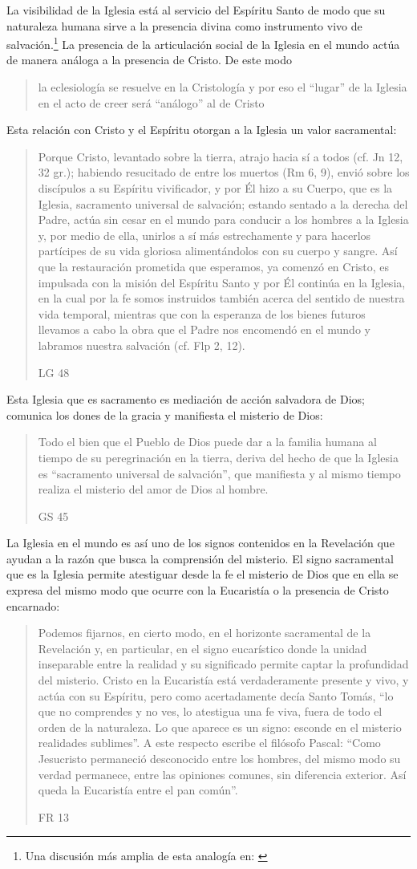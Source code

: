 La visibilidad de la Iglesia está al servicio del Espíritu Santo de modo que su
naturaleza humana sirve a la presencia divina como instrumento vivo de
salvación.\footnote{Una discusión más amplia de esta analogía en:
  \cite[292ss]{ninot2009tf}} La presencia de la articulación social de la
Iglesia en el mundo actúa de manera análoga a la presencia de Cristo. De este
modo \blockquote[{\cite[566]{ninot2009tf}}]{la eclesiología se resuelve en la
  Cristología y por eso el \enquote{lugar} de la Iglesia en el acto de creer
  será \enquote{análogo} al de Cristo}. Esta relación con Cristo y el Espíritu
otorgan a la Iglesia un valor sacramental:
\blockquote[LG 48]{Porque Cristo, levantado sobre la tierra, atrajo hacia sí a
  todos (cf. Jn 12, 32 gr.); habiendo resucitado de entre los muertos (Rm 6, 9),
  envió sobre los discípulos a su Espíritu vivificador, y por Él hizo a su
  Cuerpo, que es la Iglesia, sacramento universal de salvación; estando sentado
  a la derecha del Padre, actúa sin cesar en el mundo para conducir a los
  hombres a la Iglesia y, por medio de ella, unirlos a sí más estrechamente y
  para hacerlos partícipes de su vida gloriosa alimentándolos con su cuerpo y
  sangre. Así que la restauración prometida que esperamos, ya comenzó en Cristo,
  es impulsada con la misión del Espíritu Santo y por Él continúa en la Iglesia,
  en la cual por la fe somos instruidos también acerca del sentido de nuestra
  vida temporal, mientras que con la esperanza de los bienes futuros llevamos a
  cabo la obra que el Padre nos encomendó en el mundo y labramos nuestra
  salvación (cf. Flp 2, 12).}
Esta Iglesia que es sacramento es mediación de acción salvadora de Dios;
comunica los dones de la gracia y manifiesta el misterio de Dios:
\blockquote[GS 45]{Todo el bien que el Pueblo de Dios puede dar a la familia
  humana al tiempo de su peregrinación en la tierra, deriva del hecho de que la
  Iglesia es ``sacramento universal de salvación'', que manifiesta y al mismo
  tiempo realiza el misterio del amor de Dios al hombre.}

La Iglesia en el mundo es así uno de los signos contenidos en la Revelación que
ayudan a la razón que busca la comprensión del misterio. El signo sacramental
que es la Iglesia permite atestiguar desde la fe el misterio de Dios que en ella
se expresa del mismo modo que ocurre con la Eucaristía o la presencia de Cristo
encarnado:
\blockquote[FR 13]{Podemos fijarnos, en cierto modo, en el horizonte sacramental
  de la Revelación y, en particular, en el signo eucarístico donde la unidad
  inseparable entre la realidad y su significado permite captar la profundidad
  del misterio. Cristo en la Eucaristía está verdaderamente presente y vivo, y
  actúa con su Espíritu, pero como acertadamente decía Santo Tomás, \enquote{lo
    que no comprendes y no ves, lo atestigua una fe viva, fuera de todo el orden
    de la naturaleza. Lo que aparece es un signo: esconde en el misterio
    realidades sublimes}. A este respecto escribe el filósofo Pascal:
  \enquote{Como Jesucristo permaneció desconocido entre los hombres, del mismo
    modo su verdad permanece, entre las opiniones comunes, sin diferencia
    exterior. Así queda la Eucaristía entre el pan común}.}

